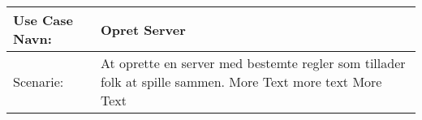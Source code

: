 \documentclass[a4paper]{article}
\begin{document}
	\begin{table}[h]
		{\renewcommand\arraystretch{1.25}
			\begin{tabular}{|l|l|l|} \hline
				Use Case Navn:& \multicolumn{2}{l|}{Opret Server} \\ \hline\hline
				Scenarie:& \multicolumn{2}{p{4cm}|}{\raggedright At oprette en server med bestemte regler som tillader folk at spille sammen. More Text more text More Text} \\ \hline
		\end{tabular}}
	\end{table}
\end{document}
